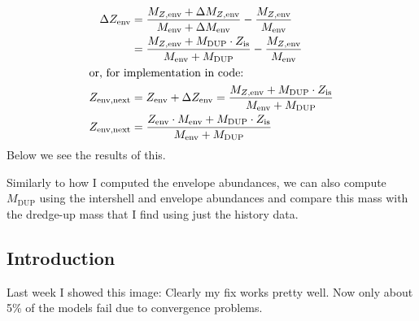 \documentclass[a4paper,10pt]{article}
\begin{document}
\begin{align*}
    \Delta Z_\text{env} &= \frac{M_\text{\(Z\),env} + \Delta M_\text{\(Z\),env}}{M_\text{env} + \Delta M_\text{env}} - \frac{M_\text{\(Z\),env}}{M_\text{env}}\\
    &= \frac{M_\text{\(Z\),env} + M_\text{DUP}\cdot Z_\text{is}}{M_\text{env} + M_\text{DUP}} - \frac{M_\text{\(Z\),env}}{M_\text{env}}\\
    \intertext{or, for implementation in code:}
    Z_\text{env,next} &= Z_\text{env} + \Delta Z_\text{env} = \frac{M_\text{\(Z\),env} + M_\text{DUP}\cdot Z_\text{is}}{M_\text{env} + M_\text{DUP}}\\
    Z_\text{env,next} &= \frac{Z_\text{env} \cdot M_\text{env} + M_\text{DUP}\cdot Z_\text{is}}{M_\text{env} + M_\text{DUP}}
\end{align*}
Below we see the results of this.
\begin{figure}[ht]
    \centering
\end{figure}
Similarly to how I computed the envelope abundances, we can also compute \(M_\text{DUP}\) using the intershell and envelope abundances and compare this mass with the dredge-up mass that I find using just the history data. 

\begin{figure}[ht]
    \centering
\end{figure}


\subsection{Introduction}
Last week I showed this image:
%
%
Clearly my fix works pretty well. Now only about 5\% of the models fail due to convergence problems.
\end{document}
